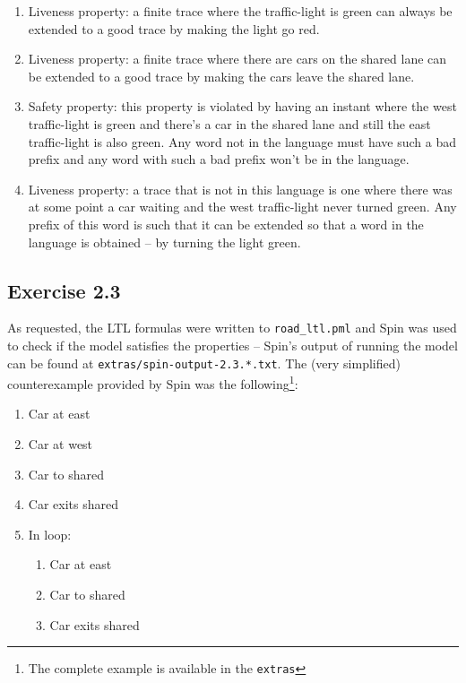 \documentclass[12pt]{article}
\newcommand{\drafter}[1]{#1}
\begin{document}
\begin{enumerate}[label=\roman*.]
\begin{enumerate}[label=(\alph*)]
  \item \drafter{Liveness property: a finite trace where the traffic-light is green can always be extended to a good trace by making the light go red.}

  \item \drafter{Liveness property: a finite trace where there are cars on the shared lane can be extended to a good trace by making the cars leave the shared lane.}

  \item \drafter{Safety property: this property is violated by having an instant where the west traffic-light is green and there's a car in the shared lane and still the east traffic-light is also green. Any word not in the language must have such a bad prefix and any word with such a bad prefix won't be in the language.}

  \item \drafter{Liveness property: a trace that is not in this language is one where there was at some point a car waiting and the west traffic-light never turned green. Any prefix of this word is such that it can be extended so that a word in the language is obtained -- by turning the light green.}

\end{enumerate}

\subsection*{Exercise 2.3}

\drafter{As requested, the LTL formulas were written to \texttt{road\_ltl.pml} and Spin was used to check if the model satisfies the properties -- Spin's output of running the model can be found at \texttt{extras/spin\allowbreak-output-2.3.*.txt}.}
\drafter{The (very simplified) counterexample provided by Spin was the following\footnote{The complete example is available in the \texttt{extras}}:}

\begin{enumerate}
  \item Car at east
  \item Car at west
  \item Car to shared
  \item Car exits shared
  \item In loop:
  \begin{enumerate}[label=\theenumi.\arabic*.]
    \item Car at east
    \item Car to shared
    \item Car exits shared
  \end{enumerate}
\end{enumerate}


\end{enumerate}
\end{document}
